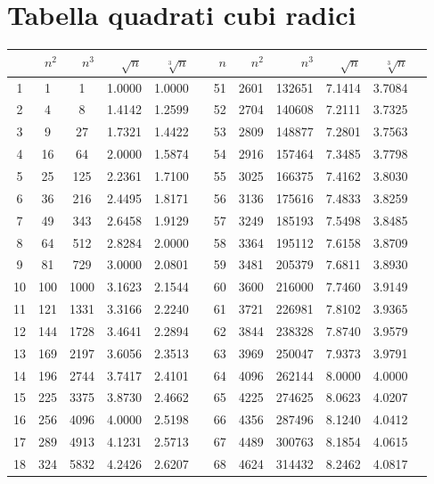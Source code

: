 
\section{Tabella quadrati cubi radici}
\label{sec:Tabellaquadraticubiradici}
	\begin{longtable}{SSSSSSSSSSSS} 
	\toprule
	\bfseries {} &   & &&& &&   & &&  \\
	\midrule \endhead
	\bottomrule \endfoot{}
1&1&1&1.0000&1.0000&&51&2601&132651&7.1414&3.7084\\
2&4&8&1.4142&1.2599&&52&2704&140608&7.2111&3.7325\\
3&9&27&1.7321&1.4422&&53&2809&148877&7.2801&3.7563\\
4&16&64&2.0000&1.5874&&54&2916&157464&7.3485&3.7798\\
5&25&125&2.2361&1.7100&&55&3025&166375&7.4162&3.8030\\
6&36&216&2.4495&1.8171&&56&3136&175616&7.4833&3.8259\\
7&49&343&2.6458&1.9129&&57&3249&185193&7.5498&3.8485\\
8&64&512&2.8284&2.0000&&58&3364&195112&7.6158&3.8709\\
9&81&729&3.0000&2.0801&&59&3481&205379&7.6811&3.8930\\
10&100&1000&3.1623&2.1544&&60&3600&216000&7.7460&3.9149\\
11&121&1331&3.3166&2.2240&&61&3721&226981&7.8102&3.9365\\
12&144&1728&3.4641&2.2894&&62&3844&238328&7.8740&3.9579\\
13&169&2197&3.6056&2.3513&&63&3969&250047&7.9373&3.9791\\
14&196&2744&3.7417&2.4101&&64&4096&262144&8.0000&4.0000\\
15&225&3375&3.8730&2.4662&&65&4225&274625&8.0623&4.0207\\
16&256&4096&4.0000&2.5198&&66&4356&287496&8.1240&4.0412\\
17&289&4913&4.1231&2.5713&&67&4489&300763&8.1854&4.0615\\
18&324&5832&4.2426&2.6207&&68&4624&314432&8.2462&4.0817\\

\end{longtable}
